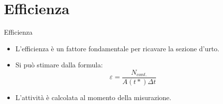 \documentclass [xcolor=svgnames] {beamer}
\begin{document}
\section{Efficienza}
\begin{frame}{Efficienza}
	\begin{itemize}
		\item<1-> L'efficienza è un fattore fondamentale per ricavare la sezione d'urto.
		\item<2-> Si può stimare dalla formula:
		\begin{equation}
			\varepsilon = \dfrac{N_{cont.}}{A(t*) \Delta t}
		\end{equation}
		\item<3-> L'attività è calcolata al momento della misurazione.
	\end{itemize}
	
	\vspace{0.5cm}
	

\end{frame}
\end{document}

